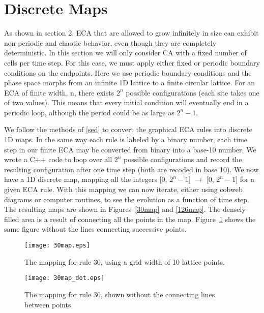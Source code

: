 \section{Discrete Maps}


As shown in section 2, ECA that are allowed to grow infinitely in size can exhibit non-periodic and chaotic behavior, even though they are completely deterministic.   In this section we will only consider CA with a fixed number of cells per time step.  For this case, we must apply either fixed or periodic boundary conditions on the endpoints.  Here we use periodic boundary conditions and the phase space morphs from an infinite 1D lattice to a finite circular lattice.  For an ECA of finite width, n, there exists $2^n$ possible configurations (each site takes one of two values).  This means that every initial condition will eventually end in a periodic loop, although the period could be as large as $2^n -1$.  

We follow the methods of \ref{sed} to convert the graphical ECA rules into discrete 1D maps.  In the same way each rule is labeled by a binary number, each time step in our finite ECA may be converted from binary into a base-10 number.  We wrote a \textsc{C++} code to loop over all $2^n$ possible configurations and record the resulting configuration after one time step (both are recoded in base 10).  We now have a 1D discrete map, mapping all the integers [0, $2^n -1$] $\rightarrow$ [0, $2^n -1$] for a given ECA rule.  With this mapping we can now iterate, either using cobweb diagrams or computer routines, to see the evolution as a function of time step.  The resulting maps are shown in Figures~\ref{30map} and \ref{126map}.  The densely filled area is a result of connecting all the points in the map.  Figure~\ref{30map_dot} shows the same figure without the  lines connecting successive points.  

\begin{figure}
    \begin{minipage}[b]{0.49\textwidth}
        \centering
        \texttt{[image: 30map.eps]}
        \caption{\label{30map} The mapping for rule 30, using a grid width of 10 lattice points.  }
    \end{minipage}
    \hspace{0.5cm}
    \begin{minipage}[b]{0.49\textwidth}
        \centering
        \texttt{[image: 30map\_dot.eps]}
        \caption{\label{30map_dot} The mapping for rule 30, shown without the connecting lines between points.}
    \end{minipage}
\end{figure}

